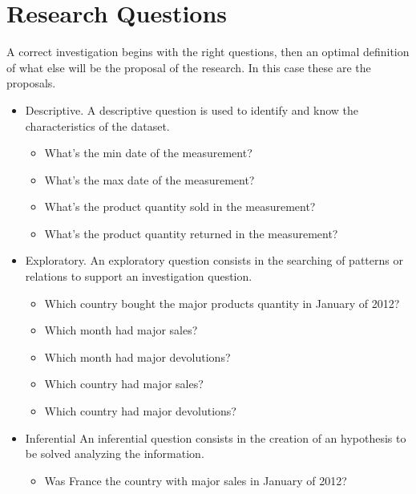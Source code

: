 \section{Research Questions}
A correct investigation begins with the right questions, then an optimal definition of what else will be the proposal of the research. In this case these are the proposals.
 \begin{itemize}
  \item{Descriptive.}
  A descriptive question is used to identify and know the characteristics of the dataset.
  \begin{itemize}
   \item What's the min date of the measurement?
   \item What's the max date of the measurement?
   \item What's the product quantity sold in the measurement?
   \item What's the product quantity returned in the measurement?
  \end{itemize}
  \item{Exploratory.}
   An exploratory question consists in the searching of patterns or relations to support an investigation question.
  \begin{itemize}
   \item Which country bought the major products quantity in January of 2012?
   \item Which month had major sales?
   \item Which month had major devolutions?
   \item Which country had major sales?
   \item Which country had major devolutions?
  \end{itemize}
  \item{Inferential}
   An inferential question consists in the creation of an hypothesis to be solved analyzing the information.
  \begin{itemize}
   \item Was France the country with major sales in January of 2012?
  \end{itemize}
 \end{itemize}